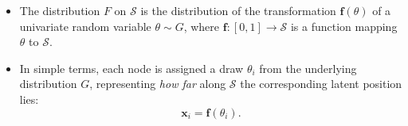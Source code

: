 \documentclass[portrait,final,x11names,a0paper,fontscale=0.36]{baposter}
\newcommand{\icl}[1]{{\bf\color{blue_icl2}{#1}}}
\renewcommand{\vec}[1]{\boldsymbol{#1}}
\begin{document}
\begin{poster}
{\begin{itemize}[leftmargin=.15in]
\begin{itemize}
\item The distribution $F$ on $\mathcal S$ is the distribution of the %
transformation $\vec f(\theta)$ of a univariate random variable $\theta\sim G$, where $\vec f:[0,1]\to\mathcal S$ is a function mapping $\theta$ %
to $\mathcal S$. 

\item In simple terms, each node is assigned a draw $\theta_i$ from the underlying distribution $G$, representing \textit{how far} along %
$\mathcal S$ the corresponding latent position lies: %
\begin{equation}
\vec x_i=\vec f(\theta_i).
\end{equation} 
\end{itemize}
\end{itemize}
}



\end{poster}
\end{document}
